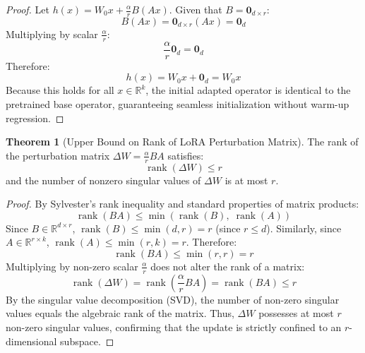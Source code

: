 \documentclass[11pt,a4paper]{article}
\theoremstyle{definition}
\newtheorem{theorem}{\textbf{Theorem}}[section]
\begin{document}
\begin{proof}
Let $h(x) = W_0 x + \frac{\alpha}{r} B(Ax)$.
Given that $B = \mathbf{0}_{d \times r}$:
{\boldmath
\begin{equation}
B(Ax) = \mathbf{0}_{d \times r} (Ax) = \mathbf{0}_d
\end{equation}
}
Multiplying by scalar $\frac{\alpha}{r}$:
{\boldmath
\begin{equation}
\frac{\alpha}{r} \mathbf{0}_d = \mathbf{0}_d
\end{equation}
}
Therefore:
{\boldmath
\begin{equation}
h(x) = W_0 x + \mathbf{0}_d = W_0 x
\end{equation}
}
Because this holds for all $x \in \mathbb{R}^k$, the initial adapted operator is identical to the pretrained base operator, guaranteeing seamless initialization without warm-up regression.
\end{proof}

\begin{theorem}[Upper Bound on Rank of LoRA Perturbation Matrix]
The rank of the perturbation matrix $\Delta W = \frac{\alpha}{r} BA$ satisfies:
{\boldmath
\begin{equation}
\operatorname{rank}(\Delta W) \le r
\end{equation}
}
and the number of nonzero singular values of $\Delta W$ is at most $r$.
\end{theorem}

\begin{proof}
By Sylvester's rank inequality and standard properties of matrix products:
{\boldmath
\begin{equation}
\operatorname{rank}(BA) \le \min(\operatorname{rank}(B), \; \operatorname{rank}(A))
\end{equation}
}
Since $B \in \mathbb{R}^{d \times r}$, $\operatorname{rank}(B) \le \min(d, r) = r$ (since $r \le d$).
Similarly, since $A \in \mathbb{R}^{r \times k}$, $\operatorname{rank}(A) \le \min(r, k) = r$.
Therefore:
{\boldmath
\begin{equation}
\operatorname{rank}(BA) \le \min(r, r) = r
\end{equation}
}
Multiplying by non-zero scalar $\frac{\alpha}{r}$ does not alter the rank of a matrix:
{\boldmath
\begin{equation}
\operatorname{rank}(\Delta W) = \operatorname{rank}\left(\frac{\alpha}{r} BA\right) = \operatorname{rank}(BA) \le r
\end{equation}
}
By the singular value decomposition (SVD), the number of non-zero singular values equals the algebraic rank of the matrix. Thus, $\Delta W$ possesses at most $r$ non-zero singular values, confirming that the update is strictly confined to an $r$-dimensional subspace.
\end{proof}
\end{document}
